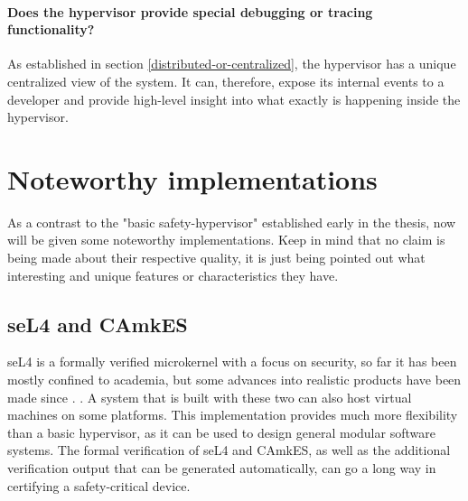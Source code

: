 \paragraph{Does the hypervisor provide special debugging or tracing functionality?}
As established in section \ref{distributed-or-centralized}, the hypervisor has a unique centralized view of the system. It can, therefore, expose its internal events to a developer and provide high-level insight into what exactly is happening inside the hypervisor.


\section{Noteworthy implementations} \label{noteworthy-implementations}
As a contrast to the "basic safety-hypervisor" established early in the thesis, now will be given some noteworthy implementations. Keep in mind that no claim is being made about their respective quality, it is just being pointed out what interesting and unique features or characteristics they have.
\subsection{seL4 and CAmkES} \label{seL4}
seL4 is a formally verified microkernel with a focus on security, so far it has been mostly confined to academia, but some advances into realistic products have been made since \cite{fisher2012hacms}. \cite{camkes}. A system that is built with these two can also host virtual machines on some platforms. This implementation provides much more flexibility than a basic hypervisor, as it can be used to design general modular software systems. The formal verification of seL4 and CAmkES, as well as the additional verification output that can be generated automatically, can go a long way in certifying a safety-critical device.
